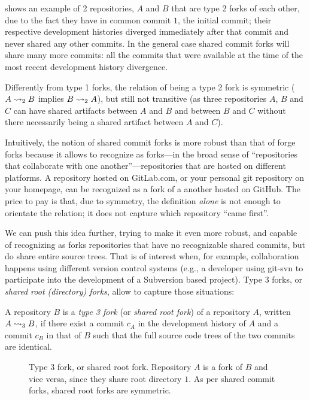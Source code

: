  shows an example of 2 repositories, $A$ and $B$ that
are type 2 forks of each other, due to the fact they have in common commit $1$,
the initial commit; their respective development histories diverged immediately
after that commit and never shared any other commits. In the general case
shared commit forks will share many more commits: all the commits that were
available at the time of the most recent development history divergence.

Differently from type 1 forks, the relation of being a type 2 fork is
symmetric ($A\rightsquigarrow_2 B$ implies $B\rightsquigarrow_2 A$), but still not transitive (as
three repositories $A$, $B$ and $C$ can have shared artifacts between $A$ and
$B$ and between $B$ and $C$ without there necessarily being a shared artifact
between $A$ and $C$).

Intuitively, the notion of shared commit forks is more robust than that of
forge forks because it allows to recognize as forks---in the broad sense of
``repositories that collaborate with one another''---repositories that are
hosted on different platforms. A repository hosted on GitLab.com, or your
personal git repository on your homepage, can be recognized as a fork of a
another hosted on GitHub. The price to pay is that, due to symmetry, the
definition \emph{alone} is not enough to orientate the relation; it does not
capture which repository ``came first''.

We can push this idea further, trying to make it even more robust, and capable
of recognizing as forks repositories that have no recognizable shared commits,
but do share entire source trees. That is of interest when, for example,
collaboration happens using different version control systems (e.g., a
developer using git-svn to participate into the development of a Subversion
based project). Type 3 forks, or \emph{shared root (directory) forks}, allow to
capture those situations:

\begin{definition}
  \label{def:rootdir-fork}
  \label{def:type3-fork}
  A repository $B$ is a \emph{type 3 fork} (or \emph{shared root fork}) of a
  repository $A$, written $A\rightsquigarrow_3 B$, if there exist a commit $c_A$ in the
  development history of $A$ and a commit $c_B$ in that of $B$ such that the
  full source code trees of the two commits are identical.
\end{definition}

\begin{figure}[t]
  \centering
  
  \caption{Type 3 fork, or shared root fork. Repository $A$ is a fork of $B$
    and vice versa, since they share root directory $1$.  As per shared commit
    forks, shared root forks are symmetric.}%
  \label{fig:rootdir-fork}
  \label{fig:type3-fork}
\end{figure}

